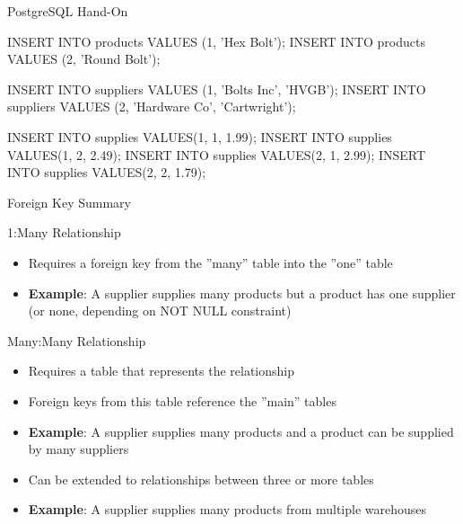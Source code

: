 \documentclass[ignorenonframetext,xcolor=x11names]{beamer}
\begin{document}
\begin{frame}[fragile]{PostgreSQL Hand-On}
\footnotesize
\begin{sqlcode}
INSERT INTO products VALUES (1, 'Hex Bolt');
INSERT INTO products VALUES (2, 'Round Bolt');

INSERT INTO suppliers VALUES (1, 'Bolts Inc', 'HVGB');
INSERT INTO suppliers 
    VALUES (2, 'Hardware Co', 'Cartwright');

INSERT INTO supplies VALUES(1, 1, 1.99);
INSERT INTO supplies VALUES(1, 2, 2.49);
INSERT INTO supplies VALUES(2, 1, 2.99);
INSERT INTO supplies VALUES(2, 2, 1.79);
\end{sqlcode}
\end{frame}

\begin{frame}{Foreign Key Summary}
\small
\begin{block}{1:Many Relationship}
\begin{itemize}
  \item Requires a foreign key from the ''many'' table into the ''one'' table
  \item \textbf{Example}: A supplier supplies many products but a product has one supplier (or none, depending on NOT NULL constraint)
\end{itemize}
\end{block}
\begin{block}{Many:Many Relationship}
\begin{itemize}
  \item Requires a table that represents the relationship
  \item Foreign keys from this table reference the ''main'' tables
  \item \textbf{Example}: A supplier supplies many products and a product can be supplied by many suppliers
  \item Can be extended to relationships between three or more tables
  \item \textbf{Example}: A supplier supplies many products from multiple warehouses
\end{itemize}
\end{block}
\end{frame}
\end{document}
